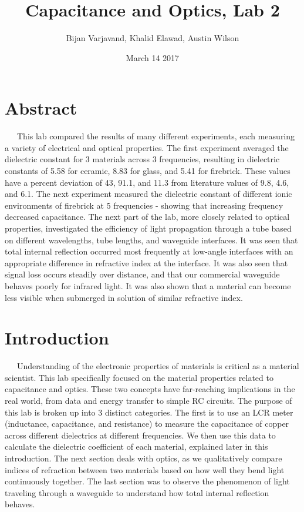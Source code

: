 \documentclass{article}
\title{Capacitance and Optics, Lab 2}
\author{Bijan Varjavand, Khalid Elawad, Austin Wilson}
\date{March 14 2017}
\begin{document}
\maketitle
\vspace{4.5 in}
\section*{Abstract}
\ \ \ This lab compared the results of many different experiments, each measuring a variety of electrical and optical properties. The first experiment averaged the dielectric constant for 3 materials across 3 frequencies, resulting in dielectric constants of 5.58 for ceramic, 8.83 for glass, and 5.41 for firebrick. These values have a percent deviation of 43, 91.1, and 11.3 from literature values of 9.8, 4.6, and 6.1. The next experiment measured the dielectric constant of different ionic environments of firebrick at 5 frequencies - showing that increasing frequency decreased capacitance. The next part of the lab, more closely related to optical properties, investigated the efficiency of light propagation through a tube based on different wavelengths, tube lengths, and waveguide interfaces. It was seen that total internal reflection occurred most frequently at low-angle interfaces with an appropriate difference in refractive index at the interface. It was also seen that signal loss occurs steadily over distance, and that our commercial waveguide behaves poorly for infrared light. It was also shown that a material can become less visible when submerged in solution of similar refractive index.


\clearpage
\onehalfspacing
\section*{Introduction}
\ \ \ Understanding of the electronic properties of materials is critical as a material scientist. This lab specifically focused on the material properties related to capacitance and optics. These two concepts have far-reaching implications in the real world, from data and energy transfer to simple RC circuits. The purpose of this lab is broken up into 3 distinct categories. The first is to use an LCR meter (inductance, capacitance, and resistance) to measure the capacitance of copper across different dielectrics at different frequencies. We then use this data to calculate the dielectric coefficient of each material, explained later in this introduction. The next section deals with optics, as we qualitatively compare indices of refraction between two materials based on how well they bend light continuously together. The last section was to observe the phenomenon of light traveling through a waveguide to understand how total internal reflection behaves.
\end{document}
